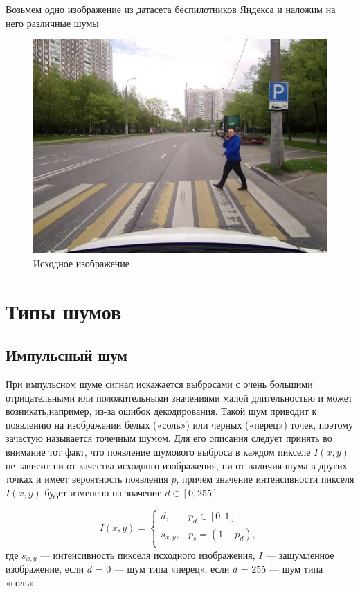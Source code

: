 Возьмем одно изображение из датасета беспилотников Яндекса и наложим на него различные шумы
\begin{figure}[ht]
    \includegraphics[width=\textwidth]{../source/image.png}
    \caption{Исходное изображение}
    \label{fig:source_image}
\end{figure}


\section{Типы шумов}

\subsection{Импульсный шум}

При импульсном шуме сигнал искажается выбросами с очень
большими отрицательными или положительными значениями малой длительностью и может возникать,например, из-за ошибок
декодирования. Такой шум приводит к появлению на изображении белых («соль») или черных («перец») точек, поэтому зачастую
называется точечным шумом. Для его описания следует принять во внимание тот факт, что появление шумового выброса в каждом
пикселе $I(x,y)$ не зависит ни от качества исходного изображения, ни от наличия шума в других точках и имеет вероятность появления
$p$, причем значение интенсивности пикселя $I(x,y)$ будет изменено на значение $d \in [0,255]$

\begin{equation}
    I(x, y) = \begin{cases}
        d, & p_d \in [0, 1]\\[1pt]
        s_{x, y}, & p_s = (1 - p_d),\\[1pt]
    \end{cases} 
\label{eq:complex_func}
\end{equation}
где $s_{x, y}$ — интенсивность пикселя исходного изображения, $I$ — зашумленное изображение, 
если $d$ = 0 — шум типа «перец», если $d$ = 255 — шум типа «соль».

